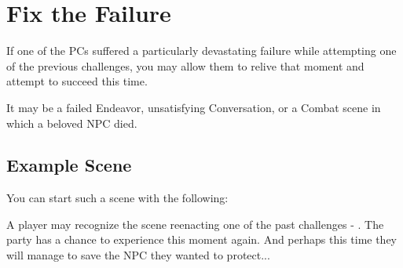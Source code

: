 \section{Fix the Failure}
\label{sec:fixTheFailure}

If one of the PCs suffered a particularly devastating failure while attempting one of the previous challenges, you may allow them to relive that moment and attempt to succeed this time.

It may be a failed Endeavor, unsatisfying Conversation, or a Combat scene in which a beloved NPC died.



\subsection{Example Scene}

You can start such a scene with the following:


A player may recognize the scene reenacting one of the past challenges - . The party has a chance to experience this moment again. And perhaps this time they will manage to save the NPC they wanted to protect...